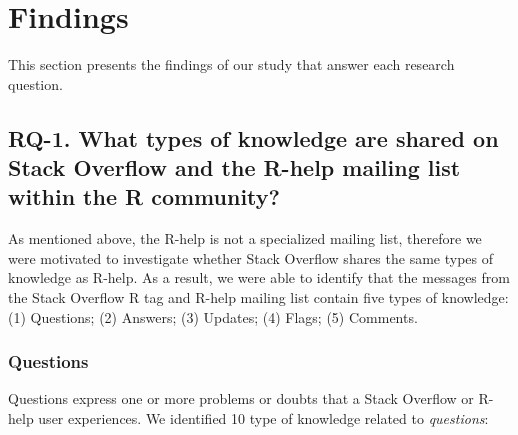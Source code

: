 \documentclass{sig-alternate-05-2015}
\begin{document}
\section{Findings}
\label{cha:findings}

This section presents the findings of our study that answer each research question.

\subsection{RQ-1. What types of knowledge are shared on Stack Overflow and the R-help mailing list within the R community?}
\label{cha:findings-types}

	As mentioned above, the R-help is not a specialized mailing list, therefore we were motivated to investigate whether Stack Overflow shares the same types of knowledge as R-help.
	As a result, we were able to identify that the messages from the Stack Overflow R tag and R-help mailing list contain five types of knowledge:
	(1) Questions;
	(2) Answers;
	(3) Updates;
	(4) Flags;
	(5) Comments.

\subsubsection{Questions}

Questions express one or more problems or doubts that a Stack Overflow or R-help user experiences.
We identified 10 type of knowledge related to \emph{questions}:
\end{document}
